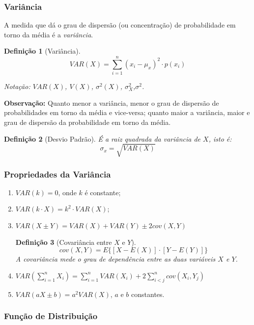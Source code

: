 \documentclass[oneside,a4paper,12pt]{article}
\newtheorem{definition}{Definição}[section]
\begin{document}
\subsubsection{Variância}

A medida que dá o grau de dispersão (ou concentração) de probabilidade em torno da média é a \emph{variância}.

\begin{definition}[Variância]
	$$VAR(X) = \sum_{i = 1}^{n}(x_i - \mu_x)^2 \cdot p(x_i)$$
	
	Notação: $VAR(X)$, $V(X)$, $\sigma^2(X)$, $\sigma_X^2$,$\sigma^2$.
\end{definition}

{\bf Observação:} Quanto menor a variância, menor o grau de dispersão de probabilidades em torno da média e vice-versa; quanto maior a variância, maior e grau de dispersão da probabilidade em torno da média.

\begin{definition}[Desvio Padrão]
	É a raiz quadrada da variância de $X$, isto é:
	$$\sigma_x = \sqrt{VAR(X)}$$
\end{definition}

\subsubsection{Propriedades da Variância}
\begin{enumerate}
	\item $VAR(k) = 0$, onde $k$ é constante;
	\item $VAR(k\cdot X) = k^2 \cdot VAR(X)$;
	\item $VAR(X \pm Y) = VAR(X) + VAR(Y) \pm 2cov(X,Y)$


\begin{definition}[Covariância entre $X$ e $Y$]
	$$cov(X,Y) =  E\{[X - E(X)]\cdot[Y - E(Y)]\}$$
	A covariância mede o grau de dependência entre as duas variáveis $X$ e $Y$.
\end{definition}
	
	\item $VAR\left(\displaystyle \sum_{i=1}^{n}X_i\right) = \displaystyle \sum_{i=1}^{n}VAR(X_i) + 2\displaystyle \sum_{i<j}^{n}cov(X_i , Y_j)$
	\item $VAR(aX \pm b) = a^2VAR(X)$, $a$ e $b$ constantes.
\end{enumerate}

\subsubsection{Função de Distribuição}
\end{document}
